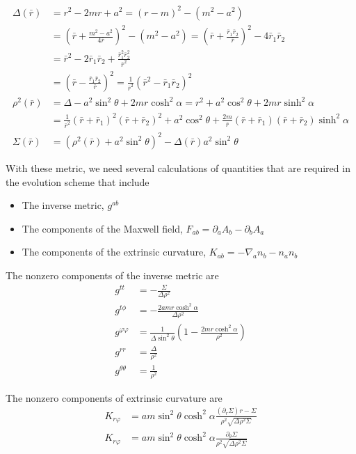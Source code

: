 \documentclass[prd]{revtex4}
\begin{document}
\begin{align}
\Delta(\bar{r}) &=r^2 - 2mr + a^2 = (r-m)^2 - (m^2 - a^2) \nonumber \\
		      &= \left(\bar{r} + \frac{m^2 - a^2}{4 \bar{r}} \right)^2 - (m^2 - a^2) = \left(\bar{r} + \frac{\bar{r}_1 \bar{r}_2}{ \bar{r}} \right)^2 - 4 \bar{r}_1 \bar{r}_2 \nonumber \\
		      &= \bar{r}^2 - 2 \bar{r}_1 \bar{r}_2 + \frac{\bar{r}_1^2 \bar{r}_2^2}{\bar{r}^2}  \nonumber \\
		      & = \left(\bar{r} - \frac{\bar{r}_1 \bar{r}_2}{ \bar{r}} \right)^2 = \frac{1}{\bar{r}^2} (\bar{r}^2 - \bar{r}_1 \bar{r}_2)^2 \\
\rho^2(\bar{r}) &=\Delta - a^2 \sin^2 \theta + 2mr \cosh^2 \alpha = r^2 + a^2 \cos^2 \theta + 2mr \sinh^2 \alpha \nonumber \\
	   &= \frac{1}{\bar{r}^2} (\bar{r} + \bar{r}_1)^2(\bar{r} + \bar{r}_2)^2 + a^2 \cos^2 \theta + \frac{2 m}{\bar{r}} (\bar{r} + \bar{r}_1)(\bar{r} + \bar{r}_2) \sinh^2 \alpha\\
\Sigma(\bar{r}) &= (\rho^2(\bar{r}) + a^2 \sin^2 \theta)^2 - \Delta(\bar{r}) a^2 \sin^2 \theta
\end{align}

With these metric, we need several calculations of quantities that are required in the evolution scheme that include
\begin{itemize}
\item The inverse metric, $g^{ab}$
\item The components of the Maxwell field, $F_{ab} = \partial_a A_b - \partial_b A_a$
\item The components of the extrinsic curvature, $K_{ab} = -\nabla_a n_b - n_a n_b$
\end{itemize}

The nonzero components of the inverse metric are
\begin{align}
g^{tt} &= -\frac{\Sigma}{\Delta \rho^2} \\
g^{t \phi} &= -\frac{2 a m r \cosh^2 \alpha}{\Delta \rho^2} \\
g^{\varphi \varphi} &= \frac{1}{\Delta \sin^2 \theta} \left(1-\frac{2 m r \cosh^2 \alpha}{\rho^2} \right) \\
g^{rr} &= \frac{\Delta}{\rho^2} \\
g^{\theta \theta} &= \frac{1}{\rho^2}
\end{align}

The nonzero components of extrinsic curvature are
\begin{align}
K_{r \varphi} &= a m \sin^2 \theta \cosh^2 \alpha \frac{ (\partial_r \Sigma)r - \Sigma}{\rho^2 \sqrt{\Delta \rho^2 \Sigma}} \\
K_{r \varphi} &= a m \sin^2 \theta \cosh^2 \alpha \frac{ \partial_\theta \Sigma}{\rho^2 \sqrt{\Delta \rho^2 \Sigma}} 
\end{align}
\end{document}
